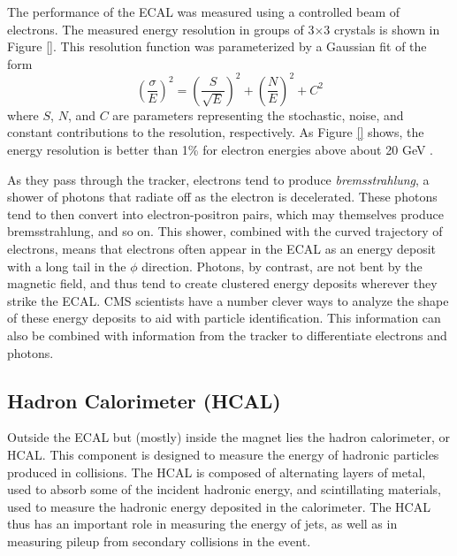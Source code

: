 The performance of the ECAL was measured using a controlled beam of
electrons. The measured energy resolution in groups of 3$\times$3
crystals is shown in Figure \ref{}.
This resolution function was parameterized by a Gaussian fit of the form
\begin{equation}
\left( \frac{\sigma}{E} \right)^2 =
\left( \frac{S}{\sqrt{E}} \right)^2 +
\left( \frac{N}{E} \right)^2 + C^2
\end{equation}
where $S$, $N$, and $C$ are parameters representing the stochastic,
noise, and constant contributions to the resolution, respectively. As
Figure \ref{} shows, the energy resolution is better
than 1\% for electron energies above about 20 GeV \cite{tdr}.


As they pass through the tracker, electrons tend to produce
\emph{bremsstrahlung}, a shower of photons that radiate off as the
electron is decelerated. These photons tend to then convert into
electron-positron pairs, which may themselves produce bremsstrahlung,
and so on. This shower, combined with the curved trajectory of
electrons, means that electrons often appear in the ECAL as an energy
deposit with a long tail in the $\phi$ direction. Photons, by
contrast, are not bent by the magnetic field, and thus tend to create
clustered energy deposits wherever they strike the ECAL. CMS
scientists have a number clever ways to analyze the shape of these
energy deposits to aid with particle identification. This information
can also be combined with information from the tracker to
differentiate electrons and photons.

\subsection{Hadron Calorimeter (HCAL)}
\label{ssec:cms:components:hcal}

Outside the ECAL but (mostly) inside the magnet lies the hadron
calorimeter, or HCAL. This component is designed to measure the energy
of hadronic particles produced in collisions. The HCAL is composed of
alternating layers of metal, used to absorb some of the incident
hadronic energy, and scintillating materials, used to measure the
hadronic energy deposited in the calorimeter. The HCAL thus has an
important role in measuring the energy of jets, as well as in
measuring pileup from secondary collisions in the event. %

